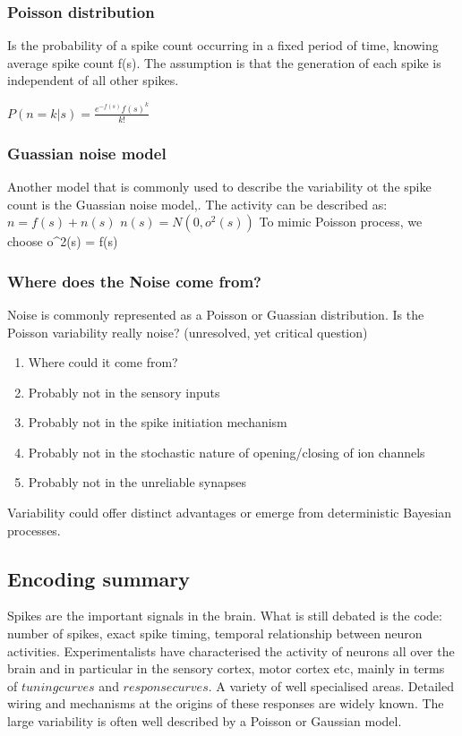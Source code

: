 \documentclass[11pt]{article}
\begin{document}
\subsubsection{Poisson distribution}
Is the probability of a spike count occurring in a fixed period of time, knowing average spike count f(s). The assumption is that the generation of each spike is independent of all other spikes. 

$P(n = k | s) = \frac{e^{-f(s)}f(s)^k}{k!}$

\subsubsection{Guassian noise model}
Another model that is commonly used to describe the variability ot the spike count is the Guassian noise model,. The activity can be described as:
$n = f(s) + n(s)$
$n(s) = N(0, o^2(s))$
To mimic Poisson process, we choose o^2(s) = f(s)

\subsubsection{Where does the Noise come from?}
Noise is commonly represented as a Poisson or Guassian distribution. Is the Poisson variability really noise? (unresolved, yet critical question)

\begin{enumerate}
\item Where could it come from?
\item Probably not in the sensory inputs
\item Probably not in the spike initiation mechanism
\item Probably not in the stochastic nature of opening/closing of ion channels
\item Probably not in the unreliable synapses
\end{enumerate} 

Variability could offer distinct advantages or emerge from deterministic Bayesian processes. 

\subsection{Encoding summary}
Spikes are the important signals in the brain. What is still debated is the code: number of spikes, exact spike timing, temporal relationship between neuron activities. 
Experimentalists have characterised the activity of neurons all over the brain and in particular in the sensory cortex, motor cortex etc, mainly in terms of $tuning curves$ and $response curves$. A variety of well specialised areas. Detailed wiring and mechanisms at the origins of these responses are widely known. 
The large variability is often well described by a Poisson or Gaussian model. 
\end{document}
